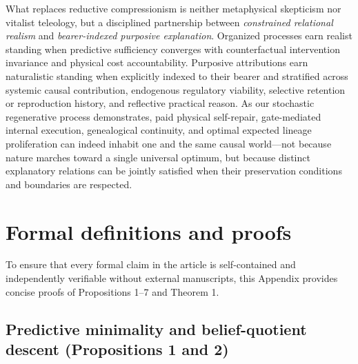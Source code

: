 \documentclass[11pt,a4paper]{article}
\begin{document}
What replaces reductive compressionism is neither metaphysical
skepticism nor vitalist teleology, but a disciplined partnership between
\emph{constrained relational realism} and \emph{bearer-indexed purposive
explanation}. Organized processes earn realist standing when predictive
sufficiency converges with counterfactual intervention invariance and
physical cost accountability. Purposive attributions earn naturalistic
standing when explicitly indexed to their bearer and stratified across
systemic causal contribution, endogenous regulatory viability, selective
retention or reproduction history, and reflective practical reason. As
our stochastic regenerative process demonstrates, paid physical
self-repair, gate-mediated internal execution, genealogical continuity,
and optimal expected lineage proliferation can indeed inhabit one and
the same causal world---not because nature marches toward a single
universal optimum, but because distinct explanatory relations can be
jointly satisfied when their preservation conditions and boundaries are
respected.

\appendix

\section{Formal definitions and
proofs}\label{formal-definitions-and-proofs}

To ensure that every formal claim in the article is self-contained and
independently verifiable without external manuscripts, this Appendix
provides concise proofs of Propositions 1--7 and Theorem 1.

\subsection{Predictive minimality and belief-quotient descent
(Propositions 1 and
2)}\label{predictive-minimality-and-belief-quotient-descent-propositions-1-and-2}
\end{document}
